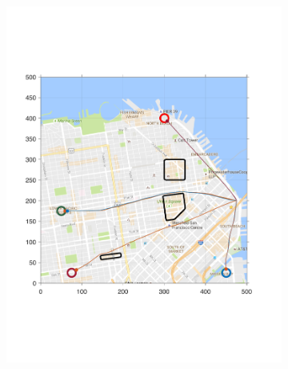 \begin{figure}[!htb]
\begin{subfigure}{\columnwidth}
  \includegraphics[width=\columnwidth]{figs/sf_d6sep5}
  \label{fig:sf_d6sep5}
\end{subfigure}%
\begin{subfigure}{\columnwidth}

\end{subfigure}
\end{figure}
